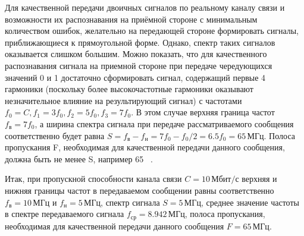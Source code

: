 Для качественной передачи двоичных сигналов по реальному каналу связи и возможности их распознавания на приёмной стороне с минимальным количеством ошибок, желательно на передающей стороне формировать сигналы, приближающиеся к прямоугольной форме. Однако, спектр таких сигналов оказывается слишком большим. Можно показать, что для качественного распознавания сигнала на приемной стороне при передаче чередующихся значений 0 и 1 достаточно сформировать сигнал, содержащий первые 4 гармоники (поскольку более высокочастотные гармоники оказывают незначительное влияние на результирующий сигнал) с частотами $f_0=C, f_1=3f_0, f_2=5f_0, f_3=7f_0$. В этом случае верхняя граница частот $f_{\text{в}}=7f_0$, а ширина спектра сигнала при передаче рассматриваемого сообщения соответственно будет равна $S = f_{\text{в}} - f_{\text{н}} = 7f_0-f_0/2=6.5f_0=65 \, \text{МГц}$. Полоса пропускания F, необходимая для качественной передачи данного сообщения, должна быть не менее S, например 65 \, .

Итак, при пропускной способности канала связи $C = 10 \, \text{Мбит/с}$ верхняя и нижняя границы частот в передаваемом сообщении равны соответственно $f_{\text{в}} = 10 \, \text{МГц}$ и $f_{\text{н}} = 5 \, \text{МГц}$, спектр сигнала $S = 5 \, \text{МГц}$, среднее значение частоты в спектре передаваемого сигнала $f_{\text{ср}} = 8.942 \, \text{МГц}$, полоса пропускания, необходимая для качественной передачи данного сообщения $F=65 \, \text{МГц}$.
